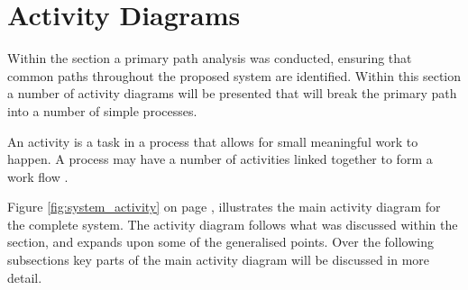 \section{Activity Diagrams}
\label{sec:activity_diagrams}

Within the  section a primary path analysis was 
conducted, ensuring that common paths throughout the proposed system are 
identified. Within this section a number of activity diagrams will be presented
that will break the primary path into a number of simple processes. 

An activity is a task in a process that allows for small meaningful work to 
happen. A process may have a number of activities linked together to form a work
flow \citep{lunn03}.

Figure \ref{fig:system_activity} on page \pageref{fig:system_activity},
illustrates the main activity diagram for the complete system. The activity
diagram follows what was discussed within the 
section, and expands upon some of the generalised points. Over the following
subsections key parts of the main activity diagram will be discussed in more
detail.

